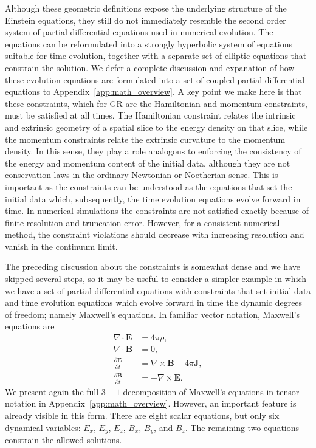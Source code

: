 Although these geometric definitions expose the underlying structure of the Einstein equations, they still do not immediately resemble the second order system of partial differential equations used in numerical evolution. The equations can be reformulated into a strongly hyperbolic system of equations suitable for time evolution, together with a separate set of elliptic equations that constrain the solution. We defer a complete discussion and expanation of how these evolution equations are formulated into a set of coupled partial differential equations to Appendix~\ref{app:math_overview}. A key point we make here is that these constraints, which for GR are the Hamiltonian and momentum constraints, must be satisfied at all times. The Hamiltonian constraint relates the intrinsic and extrinsic geometry of a spatial slice to the energy density on that slice, while the momentum constraints relate the extrinsic curvature to the momentum density. In this sense, they play a role analogous to enforcing the consistency of the energy and momentum content of the initial data, although they are not conservation laws in the ordinary Newtonian or Noetherian sense. This is important as the constraints can be understood as the equations that set the initial data which, subsequently, the time evolution equations evolve forward in time.  In numerical simulations the constraints are not satisfied exactly because of finite resolution and truncation error. However, for a consistent numerical method, the constraint violations should decrease with increasing resolution and vanish in the continuum limit.

The preceding discussion about the constraints is somewhat dense and we have skipped several steps, so it may be useful to consider a simpler example in which we have a set of partial differential equations with constraints that set initial data and time evolution equations which evolve forward in time the dynamic degrees of freedom; namely Maxwell's equations. In familiar vector notation, Maxwell's equations are
\begin{align}
\nabla \cdot \mathbf{E} &= 4\pi \rho, \\
\nabla \cdot \mathbf{B} &= 0, \\
\frac{\partial \mathbf{E}}{\partial t} &= \nabla \times \mathbf{B} - 4\pi \mathbf{J}, \\
\frac{\partial \mathbf{B}}{\partial t} &= - \nabla \times \mathbf{E}.
\end{align}
We present again the full $3+1$ decomposition of Maxwell's equations in tensor notation in Appendix~\ref{app:math_overview}. However, an important feature is already visible in this form. There are eight scalar equations, but only six dynamical variables: $E_x$, $E_y$, $E_z$, $B_x$, $B_y$, and $B_z$. The remaining two equations constrain the allowed solutions.

